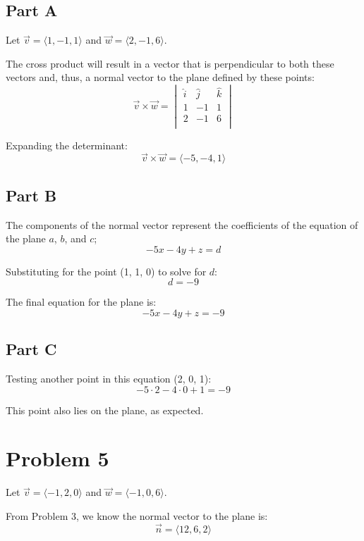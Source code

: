 \documentclass{article}
\begin{document}
\subsection*{Part A}

Let $\vec{v} = \langle 1, -1, 1 \rangle$ and $\vec{w} = \langle 2, -1, 6
\rangle$.

\bigbreak

The cross product will result in a vector that is perpendicular to both these
vectors and, thus, a normal vector to the plane defined by these points:
$$ \vec{v} \times \vec{w} = 
\begin{vmatrix}
  \hat{i} & \hat{j} & \hat{k} \\
  1 & -1 & 1 \\
  2 & -1 & 6 \\
\end{vmatrix} $$

Expanding the determinant:
$$ \vec{v} \times \vec{w} = \langle -5, -4, 1 \rangle $$

\subsection*{Part B}

The components of the normal vector represent the coefficients of the equation
of the plane $a$, $b$, and $c$;
$$ -5 x -4 y + z = d $$

Substituting for the point (1, 1, 0) to solve for $d$:
$$ d = -9$$

The final equation for the plane is:
$$ -5 x -4 y + z = -9 $$

\subsection*{Part C} 

Testing another point in this equation (2, 0, 1):
$$ -5 \cdot 2 - 4 \cdot 0 + 1 = -9$$

This point also lies on the plane, as expected.

\section*{Problem 5}

Let $\vec{v} = \langle -1, 2, 0 \rangle$ and $\vec{w} = \langle -1, 0, 6
\rangle$.

\bigbreak

From Problem 3, we know the normal vector to the plane is:
$$ \vec{n} = \langle 12, 6, 2 \rangle $$
\end{document}
